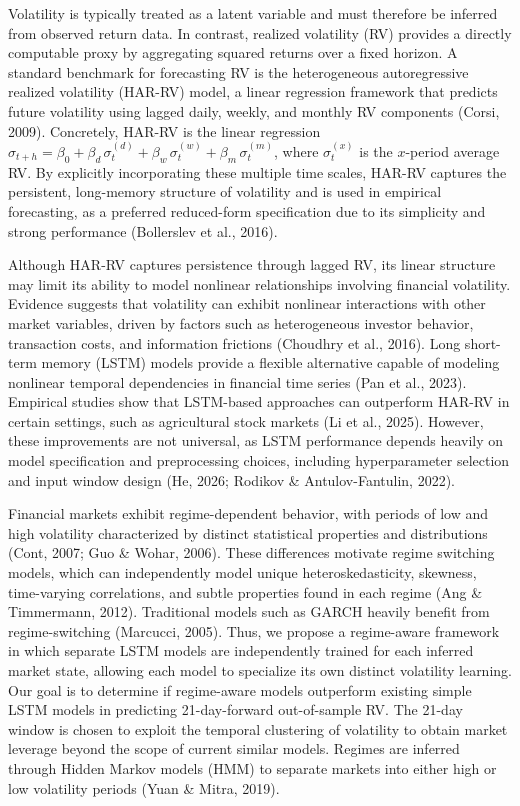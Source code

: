 \documentclass{article}
\begin{document}
Volatility is typically treated as a latent variable and must therefore be inferred from observed return data. In contrast, realized volatility (RV) provides a directly computable proxy by aggregating squared returns over a fixed horizon. A standard benchmark for forecasting RV is the heterogeneous autoregressive realized volatility (HAR-RV) model, a linear regression framework that predicts future volatility using lagged daily, weekly, and monthly RV components (Corsi, 2009).   Concretely, HAR-RV is the linear regression $\widehat{\sigma}_{t+h} = \beta_0 + \beta_d\,\sigma_t^{(d)} + \beta_w\,\sigma_t^{(w)} + \beta_m\,\sigma_t^{(m)}$, where $\sigma_t^{(x)}$ is the $x$-period average RV.  By explicitly incorporating these multiple time scales, HAR-RV captures the persistent, long-memory structure of volatility and is used in empirical forecasting, as a preferred reduced-form specification due to its simplicity and strong performance (Bollerslev et al., 2016).

Although HAR-RV captures persistence through lagged RV, its linear structure may limit its ability to model nonlinear relationships involving financial volatility. Evidence suggests that volatility can exhibit nonlinear interactions with other market variables, driven by factors such as heterogeneous investor behavior, transaction costs, and information frictions (Choudhry et al., 2016). Long short-term memory (LSTM) models provide a flexible alternative capable of modeling nonlinear temporal dependencies in financial time series (Pan et al., 2023). Empirical studies show that LSTM-based approaches can outperform HAR-RV in certain settings, such as agricultural stock markets (Li et al., 2025). However, these improvements are not universal, as LSTM performance depends heavily on model specification and preprocessing choices, including hyperparameter selection and input window design (He, 2026; Rodikov \& Antulov-Fantulin, 2022).

Financial markets exhibit regime-dependent behavior, with periods of low and high volatility characterized by distinct statistical properties and distributions (Cont, 2007; Guo \& Wohar, 2006). These differences motivate regime switching models, which can independently model unique heteroskedasticity, skewness, time-varying correlations, and subtle properties found in each regime (Ang \& Timmermann, 2012). Traditional models such as GARCH heavily benefit from regime-switching (Marcucci, 2005). Thus, we propose a regime-aware framework in which separate LSTM models are independently trained for each inferred market state, allowing each model to specialize its own distinct volatility learning. Our goal is to determine if regime-aware models outperform existing simple LSTM models in predicting 21-day-forward out-of-sample RV. The 21-day window is chosen to exploit the temporal clustering of volatility to obtain market leverage beyond the scope of current similar models. Regimes are inferred through Hidden Markov models (HMM) to separate markets into either high or low volatility periods (Yuan \& Mitra, 2019).
\end{document}
